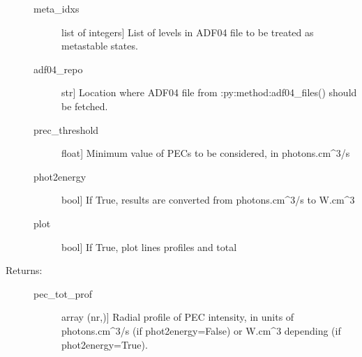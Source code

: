 \documentclass[letterpaper,10pt,english]{sphinxmanual}
\begin{document}
\begin{fulllineitems}
\begin{description}
\begin{description}
\item[{meta\_idxs}] \leavevmode{[}list of integers{]}
List of levels in ADF04 file to be treated as metastable states.

\item[{adf04\_repo}] \leavevmode{[}str{]}
Location where ADF04 file from :py:method:adf04\_files() should be fetched.

\item[{prec\_threshold}] \leavevmode{[}float{]}
Minimum value of PECs to be considered, in photons.cm\textasciicircum{}3/s

\item[{phot2energy}] \leavevmode{[}bool{]}
If True, results are converted from photons.cm\textasciicircum{}3/s to W.cm\textasciicircum{}3

\item[{plot}] \leavevmode{[}bool{]}
If True, plot lines profiles and total

\end{description}

\item[{Returns:}] \leavevmode\begin{description}
\item[{pec\_tot\_prof}] \leavevmode{[}array (nr,){]}
Radial profile of PEC intensity, in units of photons.cm\textasciicircum{}3/s (if phot2energy=False) or 
W.cm\textasciicircum{}3 depending (if phot2energy=True).

\end{description}

\end{description}

\end{fulllineitems}

\end{document}

